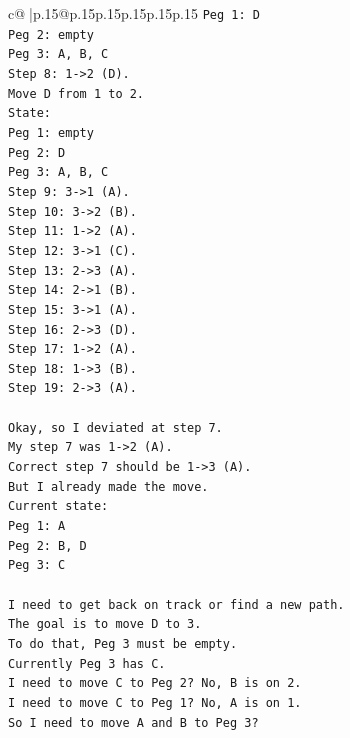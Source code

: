 \documentclass{article}
\begin{document}
{\begin{supertabular}{c@{$\;$}|p{.15\linewidth}@{}p{.15\linewidth}p{.15\linewidth}p{.15\linewidth}p{.15\linewidth}p{.15\linewidth}}
{{{\texttt{Peg 1: D} \\
\texttt{Peg 2: empty} \\
\texttt{Peg 3: A, B, C} \\
\texttt{Step 8: 1{-}>2 (D).} \\
\texttt{Move D from 1 to 2.} \\
\texttt{State:} \\
\texttt{Peg 1: empty} \\
\texttt{Peg 2: D} \\
\texttt{Peg 3: A, B, C} \\
\texttt{Step 9: 3{-}>1 (A).} \\
\texttt{Step 10: 3{-}>2 (B).} \\
\texttt{Step 11: 1{-}>2 (A).} \\
\texttt{Step 12: 3{-}>1 (C).} \\
\texttt{Step 13: 2{-}>3 (A).} \\
\texttt{Step 14: 2{-}>1 (B).} \\
\texttt{Step 15: 3{-}>1 (A).} \\
\texttt{Step 16: 2{-}>3 (D).} \\
\texttt{Step 17: 1{-}>2 (A).} \\
\texttt{Step 18: 1{-}>3 (B).} \\
\texttt{Step 19: 2{-}>3 (A).} \\
\\ 
\texttt{Okay, so I deviated at step 7.} \\
\texttt{My step 7 was 1{-}>2 (A).} \\
\texttt{Correct step 7 should be 1{-}>3 (A).} \\
\texttt{But I already made the move.} \\
\texttt{Current state:} \\
\texttt{Peg 1: A} \\
\texttt{Peg 2: B, D} \\
\texttt{Peg 3: C} \\
\\ 
\texttt{I need to get back on track or find a new path.} \\
\texttt{The goal is to move D to 3.} \\
\texttt{To do that, Peg 3 must be empty.} \\
\texttt{Currently Peg 3 has C.} \\
\texttt{I need to move C to Peg 2? No, B is on 2.} \\
\texttt{I need to move C to Peg 1? No, A is on 1.} \\
\texttt{So I need to move A and B to Peg 3?} \\
}}}
\end{supertabular}}
\end{document}
